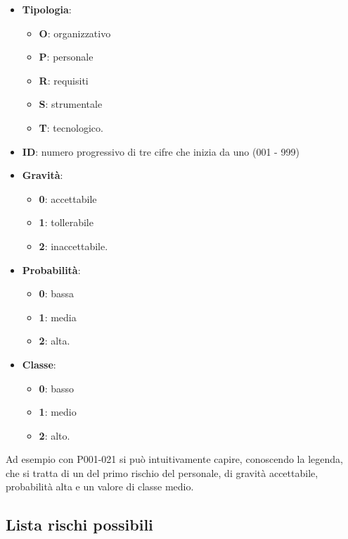 	\begin{itemize}
		\item \textbf{Tipologia}:
			\begin{itemize}
				\item \textbf{O}: organizzativo
				\item \textbf{P}: personale
				\item \textbf{R}: requisiti
				\item \textbf{S}: strumentale
				\item \textbf{T}: tecnologico.
			\end{itemize}

		\item \textbf{ID}: numero progressivo di tre cifre che inizia da uno (001 - 999)
		\item \textbf{Gravità}:
			\begin{itemize}
				\item \textbf{0}: accettabile
				\item \textbf{1}: tollerabile
				\item \textbf{2}: inaccettabile.
			\end{itemize}

		\item \textbf{Probabilità}:
			\begin{itemize}
				\item \textbf{0}: bassa
				\item \textbf{1}: media
				\item \textbf{2}: alta.
			\end{itemize}

		\item \textbf{Classe}:
			\begin{itemize}
				\item \textbf{0}: basso
				\item \textbf{1}: medio
				\item \textbf{2}: alto.
			\end{itemize}
	\end{itemize}

	Ad esempio con P001-021 si può intuitivamente capire, conoscendo la legenda, che si tratta di un del primo rischio del personale, di gravità accettabile, probabilità alta e un valore di classe medio.
	
	\subsection{Lista rischi possibili}
	
